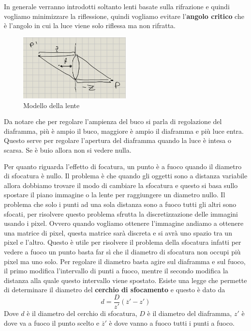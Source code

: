 In generale verranno introdotti soltanto lenti basate sulla rifrazione e quindi 
vogliamo minimizzare la riflessione, quindi vogliamo evitare l'\textbf{angolo critico}
 che è l'angolo in cui la luce viene solo riflessa ma non rifratta.

\begin{figure}
    \centering
    \includegraphics*[width=0.5\textwidth]{figure/legge_lente.jpg}
    \caption{Modello della lente}
    \label{fig:model_lenses}
\end{figure}

Da notare che per regolare l'ampienza del buco si parla di regolazione del diaframma,
più è ampio il buco, maggiore è ampio il diaframma e più luce entra. Questo serve 
per regolare l'apertura del diaframma quando la luce è intesa o scarsa. Se è buio 
allora non si vedere nulla.

Per quanto riguarda l'effetto di focatura, un punto è a fuoco quando il diametro di
sfocatura è nullo. Il problema è che quando gli oggetti sono a distanza variabile 
allora dobbiamo trovare il modo di cambiare la sfocatura e questo si basa sullo 
spostare il piano immagine o la lente per raggiungere un diametro nullo. Il problema 
che solo i punti ad una sola distanza sono a fuoco tutti gli altri sono sfocati, 
per risolvere questo problema sfrutta la discretizzazione delle immagini usando i 
pixel. Ovvero quando vogliamo ottenere l'immagine andiamo a ottenere una matrice 
di pixel, questa matrice sarà discreta e si avrà uno spazio tra un pixel e l'altro.
Questo è utile per risolvere il problema della sfocatura infatti per vedere a fuoco 
un punto basta far sì che il diametro di sfocatura non occupi più pixel ma uno solo.
Per regolare il diametro basta agire sul diaframma e sul fuoco, il primo modifica 
l'intervallo di punti a fuoco, mentre il secondo modifica la distanza alla quale questo 
intervallo viene spostato. Esiste una legge che permette di determinare il diametro 
del \textbf{cerchio di sfocamento} e questo è dato da
$$d= \frac{D}{z'}(\overline{z}'-z')$$
Dove $d$ è il diametro del cerchio di sfocatura, $D$ è il diametro del diaframma,
$z'$ è dove va a fuoco il punto scelto e $\overline{z}'$ è dove vanno a fuoco tutti 
i punti a fuoco.


